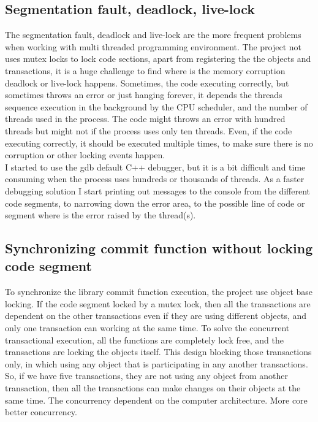 \documentclass[12pt]{article}
\begin{document}
\subsection{Segmentation fault, deadlock, live-lock}
The segmentation fault, deadlock and live-lock are the more frequent problems when working with multi threaded programming environment. The project not uses mutex locks to lock code sections, apart from registering the the objects and transactions, it is a huge challenge to find where is the memory corruption deadlock or live-lock happens. Sometimes, the code executing correctly, but sometimes throws an error or just hanging forever, it depends the threads sequence execution in the background by the CPU scheduler, and the number of threads used in the process. The code might throws an error with hundred threads but might not if the process uses only ten threads. Even, if the code executing correctly, it should be executed multiple times, to make sure there is no corruption or other locking events happen.\\

I started to use the gdb default C++ debugger, but it is a bit difficult and time consuming when the process uses hundreds or thousands of threads. As a faster debugging solution I start printing out messages to the console from the different code segments, to narrowing down the error area, to the possible line of code or segment where is the error raised by the thread(s).    

\subsection{Synchronizing commit function without locking code segment }
To synchronize the library commit function execution, the project use object base locking. If the code segment locked by a mutex lock, then all the transactions are dependent on the other transactions even if they are using different objects, and only one transaction can working at the same time. To solve the concurrent transactional execution, all the functions are completely lock free, and the transactions are locking the objects itself. This design blocking those transactions only, in which using any object that is participating in any another transactions. So, if we have five transactions, they are not using any object from another transaction, then all the transactions can make changes on their objects at the same time. The concurrency dependent on the computer architecture. More core better concurrency.
\end{document}
